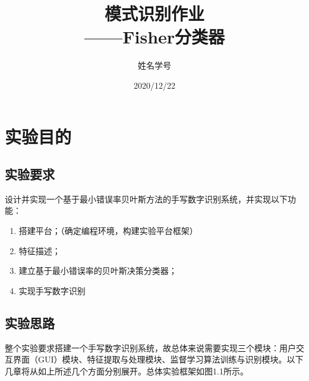\documentclass[UTF8, a4paper, 12pt]{report}
\title{模式识别作业\\——Fisher分类器}
\author{姓名学号}
\date{2020/12/22}
\begin{document}
\maketitle %
\thispagestyle{empty} %
\clearpage %

\pagestyle{plain} %
\setcounter{page}{1} %
\tableofcontents %
\clearpage

\pagestyle{fancy} %
\setcounter{page}{1} %

\chapter{实验目的}
	\section{实验要求}
		设计并实现一个基于最小错误率贝叶斯方法的手写数字识别系统，并实现以下功能：
		\begin{enumerate}[itemindent=1em]
			\renewcommand{\labelenumi}{\theenumi)}
			\item 搭建平台；（确定编程环境，构建实验平台框架）
			\item 特征描述；
			\item 建立基于最小错误率的贝叶斯决策分类器；
			\item 实现手写数字识别
		\end{enumerate}

	\section{实验思路}
		整个实验要求搭建一个手写数字识别系统，故总体来说需要实现三个模块：用户交互界面（GUI）模块、特征提取与处理模块、监督学习算法训练与识别模块。以下几章将从如上所述几个方面分别展开。总体实验框架如图1.1所示。
\end{document}

